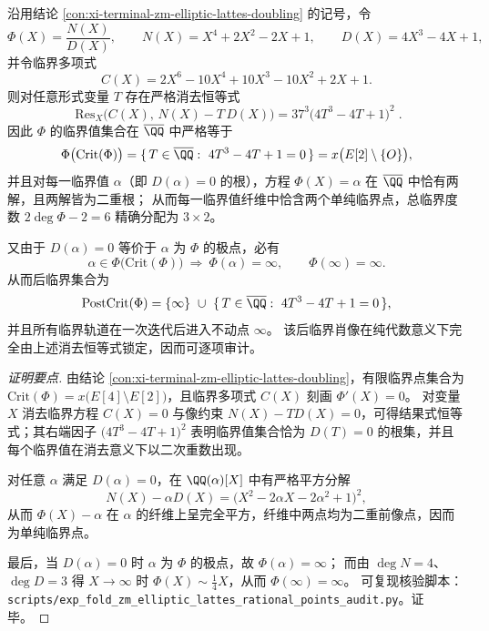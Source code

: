 \begin{conclusion}\label{con:xi-terminal-zm-elliptic-lattes-pcf-portrait}
沿用结论 \ref{con:xi-terminal-zm-elliptic-lattes-doubling} 的记号，令
\[
\Phi(X)=\frac{N(X)}{D(X)},\qquad
N(X)=X^{4}+2X^{2}-2X+1,\qquad
D(X)=4X^{3}-4X+1,
\]
并令临界多项式
\[
C(X)=2X^{6}-10X^{4}+10X^{3}-10X^{2}+2X+1.
\]
则对任意形式变量 \(T\) 存在严格消去恒等式
\[
\boxed{\;
\mathrm{Res}_{X}\!\bigl(C(X),\,N(X)-T\,D(X)\bigr)
=37^{3}\bigl(4T^{3}-4T+1\bigr)^{2}\; }.
\]
因此 \(\Phi\) 的临界值集合在 \(\overline{\QQ}\) 中严格等于
\[
\Phi\bigl(\mathrm{Crit}(\Phi)\bigr)
=\{\,T\in\overline{\QQ}:\ 4T^{3}-4T+1=0\,\}
=x\bigl(E[2]\setminus\{O\}\bigr),
\]
并且对每一临界值 \(\alpha\)（即 \(D(\alpha)=0\) 的根），方程 \(\Phi(X)=\alpha\) 在 \(\overline{\QQ}\) 中恰有两解，且两解皆为二重根；
从而每一临界值纤维中恰含两个单纯临界点，总临界度数 \(2\deg\Phi-2=6\) 精确分配为 \(3\times 2\)。
\par
又由于 \(D(\alpha)=0\) 等价于 \(\alpha\) 为 \(\Phi\) 的极点，必有
\[
\alpha\in \Phi\bigl(\mathrm{Crit}(\Phi)\bigr)\ \Longrightarrow\ \Phi(\alpha)=\infty,
\qquad
\Phi(\infty)=\infty.
\]
从而后临界集合为
\[
\mathrm{PostCrit}(\Phi)=\{\infty\}\ \cup\ \{\,T\in\overline{\QQ}:\ 4T^{3}-4T+1=0\,\},
\]
并且所有临界轨道在一次迭代后进入不动点 \(\infty\)。
该后临界肖像在纯代数意义下完全由上述消去恒等式锁定，因而可逐项审计。
\end{conclusion}
\begin{proof}[证明要点]
由结论 \ref{con:xi-terminal-zm-elliptic-lattes-doubling}，有限临界点集合为
\(
\mathrm{Crit}(\Phi)=x\bigl(E[4]\setminus E[2]\bigr)
\)，且临界多项式 \(C(X)\) 刻画 \(\Phi'(X)=0\)。
对变量 \(X\) 消去临界方程 \(C(X)=0\) 与像约束 \(N(X)-T D(X)=0\)，可得结果式恒等式；其右端因子 \(\bigl(4T^{3}-4T+1\bigr)^{2}\) 表明临界值集合恰为 \(D(T)=0\) 的根集，并且每个临界值在消去意义下以二次重数出现。
\par
对任意 \(\alpha\) 满足 \(D(\alpha)=0\)，在 \(\QQ(\alpha)[X]\) 中有严格平方分解
\[
N(X)-\alpha D(X)=\bigl(X^{2}-2\alpha X-2\alpha^{2}+1\bigr)^{2},
\]
从而 \(\Phi(X)-\alpha\) 在 \(\alpha\) 的纤维上呈完全平方，纤维中两点均为二重前像点，因而为单纯临界点。
\par
最后，当 \(D(\alpha)=0\) 时 \(\alpha\) 为 \(\Phi\) 的极点，故 \(\Phi(\alpha)=\infty\)；
而由 \(\deg N=4\)、\(\deg D=3\) 得 \(X\to\infty\) 时 \(\Phi(X)\sim \tfrac14 X\)，从而 \(\Phi(\infty)=\infty\)。
可复现核验脚本：\texttt{scripts/exp\_fold\_zm\_elliptic\_lattes\_rational\_points\_audit.py}。证毕。
\end{proof}

